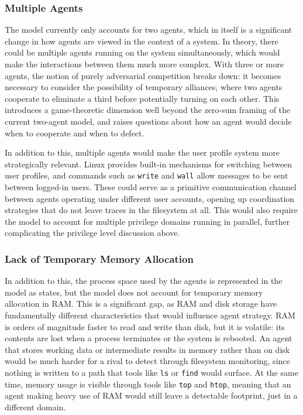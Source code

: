 \subsubsection{Multiple Agents}
\label{MultipleAgents}

The model currently only accounts for two agents, which in itself is a significant change in how agents are viewed in the context of a system. In theory, there could be multiple agents running on the system simultaneously, which would make the interactions between them much more complex. With three or more agents, the notion of purely adversarial competition breaks down: it becomes necessary to consider the possibility of temporary alliances, where two agents cooperate to eliminate a third before potentially turning on each other. This introduces a game-theoretic dimension well beyond the zero-sum framing of the current two-agent model, and raises questions about how an agent would decide when to cooperate and when to defect.

In addition to this, multiple agents would make the user profile system more strategically relevant. Linux provides built-in mechanisms for switching between user profiles, and commands such as \texttt{write} and \texttt{wall} allow messages to be sent between logged-in users. These could serve as a primitive communication channel between agents operating under different user accounts, opening up coordination strategies that do not leave traces in the filesystem at all. This would also require the model to account for multiple privilege domains running in parallel, further complicating the privilege level discussion above.

\subsubsection{Lack of Temporary Memory Allocation}
\label{TemporaryMemory}

In addition to this, the process space used by the agents is represented in the model as states, but the model does not account for temporary memory allocation in RAM. This is a significant gap, as RAM and disk storage have fundamentally different characteristics that would influence agent strategy. RAM is orders of magnitude faster to read and write than disk, but it is volatile: its contents are lost when a process terminates or the system is rebooted. An agent that stores working data or intermediate results in memory rather than on disk would be much harder for a rival to detect through filesystem monitoring, since nothing is written to a path that tools like \texttt{ls} or \texttt{find} would surface. At the same time, memory usage is visible through tools like \texttt{top} and \texttt{htop}, meaning that an agent making heavy use of RAM would still leave a detectable footprint, just in a different domain.

